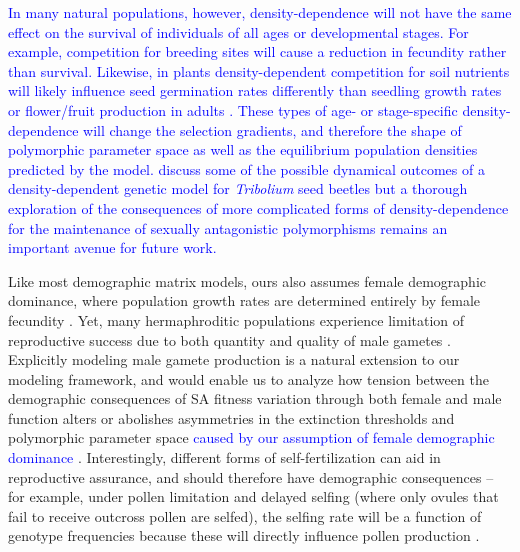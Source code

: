 \documentclass[11pt]{article}
\begin{document}
\textcolor{blue}{In many natural populations, however, density-dependence will not have the same effect on the survival of individuals of all ages or developmental stages. For example, competition for breeding sites will cause a reduction in fecundity rather than survival. Likewise, in plants density-dependent competition for soil nutrients will likely influence seed germination rates differently than seedling growth rates or flower/fruit production in adults \citep{AntonovicsLevin1980}. These types of age- or stage-specific density-dependence will change the selection gradients, and therefore the shape of polymorphic parameter space as well as the equilibrium population densities predicted by the model. \citet{de2020matrix} discuss some of the possible dynamical outcomes of a density-dependent genetic model for \textit{Tribolium} seed beetles but a thorough exploration of the consequences of more complicated forms of density-dependence for the maintenance of sexually antagonistic polymorphisms remains an important avenue for future work.}

Like most demographic matrix models, ours also assumes female demographic dominance, where population growth rates are determined entirely by female fecundity \citep{pollard1975mathematical,Caswell2001,iannelli2005gender}. Yet, many hermaphroditic populations experience limitation of reproductive success due to both quantity and quality of male gametes \citep[e.g.,][]{Yund2000,AizenHarder2007, Harder2016}. Explicitly modeling male gamete production is a natural extension to our modeling framework, and would enable us to analyze how tension between the demographic consequences of SA fitness variation through both female and male function alters or abolishes asymmetries in the extinction thresholds and polymorphic parameter space \textcolor{blue}{caused by our assumption of female demographic dominance} \citep[e.g.,][]{Tazzyman2015}.  Interestingly, different forms of self-fertilization can aid in reproductive assurance, and should therefore have demographic consequences -- for example, under pollen limitation and delayed selfing (where only ovules that fail to receive outcross pollen are selfed), the selfing rate will be a function of genotype frequencies because these will directly influence pollen production \citep{HarderBarrett2006}.
\end{document}
